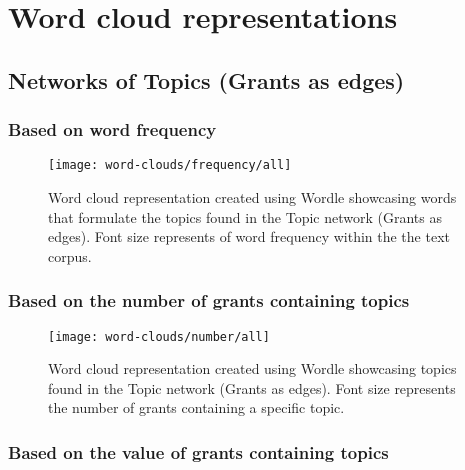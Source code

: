 \chapter{Word cloud representations}
\label{appendix:word_cloud_representations}

\section{Networks of Topics (Grants as edges)}

\subsection{Based on word frequency}

\begin{figure}[htbp]
    \centering
    \texttt{[image: word-clouds/frequency/all]}
    \caption[Word cloud representation based on word frequency showcasing words that formulate the topics found in the Topic network (Grants as edges)]{Word cloud representation created using Wordle showcasing words that formulate the topics found in the Topic network (Grants as edges). Font size represents of word frequency within the the text corpus.}
    \label{fig:topic_grant_freq_all}
\end{figure}

\subsection{Based on the number of grants containing topics}

\begin{figure}[htbp]
    \centering
    \texttt{[image: word-clouds/number/all]}
    \caption[Word cloud representation based on the number of grants containing topics found in the Topic network (Grants as edges)]{Word cloud representation created using Wordle showcasing topics found in the Topic network (Grants as edges). Font size represents the number of grants containing a specific topic.}
    \label{fig:topic_grant_number_all}
\end{figure}

\clearpage

\subsection{Based on the value of grants containing topics}


